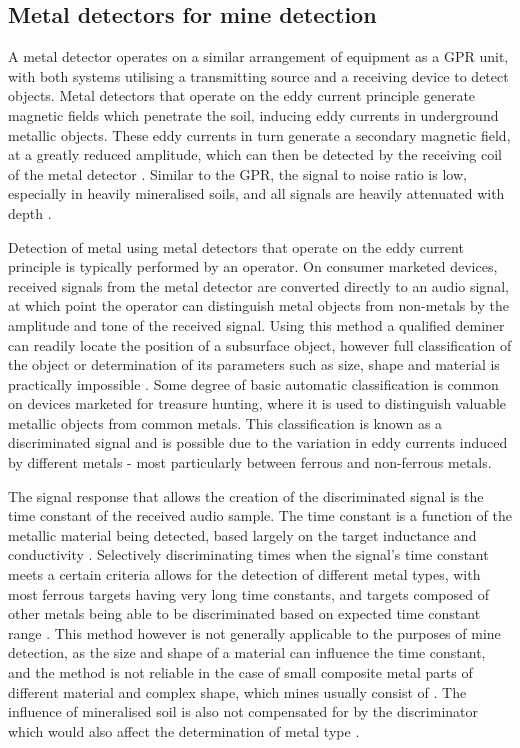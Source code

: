 \documentclass[main.tex]{subfiles}
\begin{document}
\subsection{Metal detectors for mine detection}
A metal detector operates on a similar arrangement of equipment as a GPR unit, with both systems utilising a transmitting source and a receiving device to detect objects. Metal detectors that operate on the eddy current principle generate magnetic fields which penetrate the soil, inducing eddy currents in underground metallic objects. These eddy currents in turn generate a secondary magnetic field, at a greatly reduced amplitude, which can then be detected by the receiving coil of the metal detector \parencite{Candy2008}. Similar to the GPR, the signal to noise ratio is low, especially in heavily mineralised soils, and all signals are heavily attenuated with depth \parencite{Candy2008}.

Detection of metal using metal detectors that operate on the eddy current principle is typically performed by an operator. On consumer marketed devices, received signals from the metal detector are converted directly to an audio signal, at which point the operator can distinguish metal objects from non-metals by the amplitude and tone of the received signal. Using this method a qualified deminer can readily locate the position of a subsurface object, however full classification of the object or determination of its parameters such as size, shape and material is practically impossible \parencite{Kruger2006}. Some degree of basic automatic classification is common on devices marketed for treasure hunting, where it is used to distinguish valuable metallic objects from common metals. This classification is known as a discriminated signal and is possible due to the variation in eddy currents induced by different metals - most particularly between ferrous and non-ferrous metals. 

The signal response that allows the creation of the discriminated signal is the time constant of the received audio sample. The time constant is a function of the metallic material being detected, based largely on the target inductance and conductivity \parencite{Candy2008}. Selectively discriminating times when the signal's time constant meets a certain criteria allows for the detection of different metal types, with most ferrous targets having very long time constants, and targets composed of other metals being able to be discriminated based on expected time constant range \parencite{Candy2008}. This method however is not generally applicable to the purposes of mine detection, as the size and shape of a material can influence the time constant, and the method is not reliable in the case of small composite metal parts of different material and complex shape, which mines usually consist of \parencite{Kruger2006}. The influence of mineralised soil is also not compensated for by the discriminator which would also affect the determination of metal type \parencite{Kruger2006}.
\end{document}
